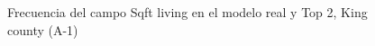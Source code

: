 \begin{figure}[H]
    \centering
    
    \caption{Frecuencia del campo Sqft living en el modelo real y Top 2, King county (A-1)}
    \label{frecuency-top2-sqft living}
\end{figure}